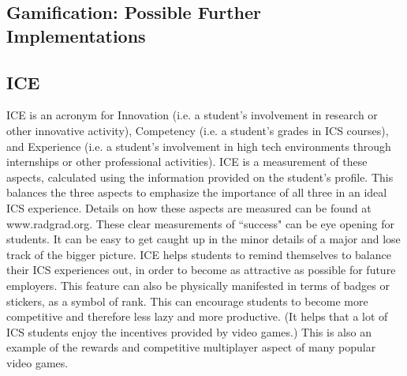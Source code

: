 \subsection{Gamification: Possible Further Implementations}

\subsection{ICE}
ICE is an acronym for Innovation (i.e. a student's involvement in research or other innovative activity), Competency (i.e. a student's grades in ICS courses), and Experience (i.e. a student's involvement in high tech environments through internships or other professional activities). ICE is a measurement of these aspects, calculated using the information provided on the student's profile. This balances the three aspects to emphasize the importance of all three in an ideal ICS experience. Details on how these aspects are measured can be found at www.radgrad.org. These clear measurements of ``success" can be eye opening for students. It can be easy to get caught up in the minor details of a major and lose track of the bigger picture. ICE helps students to remind themselves to balance their ICS experiences out, in order to become as attractive as possible for future employers. This feature can also be physically manifested in terms of badges or stickers, as a symbol of rank. This can encourage students to become more competitive and therefore less lazy and more productive. (It helps that a lot of ICS students enjoy the incentives provided by video games.) This is also an example of the rewards and competitive multiplayer aspect of many popular video games. 




